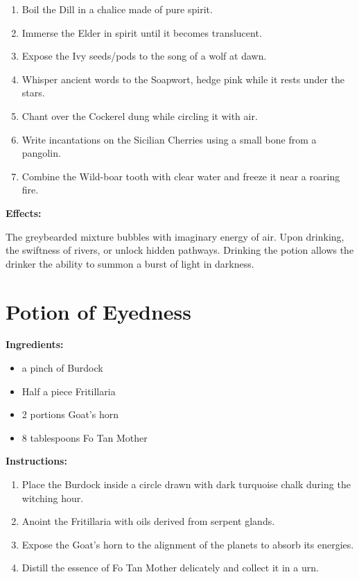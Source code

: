 \documentclass{article}
\begin{document}
\begin{enumerate}
  \item Boil the Dill in a chalice made of pure spirit.
  \item Immerse the Elder in spirit until it becomes translucent.
  \item Expose the Ivy seeds/pods to the song of a wolf at dawn.
  \item Whisper ancient words to the Soapwort, hedge pink while it rests under the stars.
  \item Chant over the Cockerel dung while circling it with air.
  \item Write incantations on the Sicilian Cherries using a small bone from a pangolin.
  \item Combine the Wild-boar tooth with clear water and freeze it near a roaring fire.
\end{enumerate}

\textbf{Effects:}

The greybearded mixture bubbles with imaginary energy of air. Upon drinking, the swiftness of rivers, or unlock hidden pathways. Drinking the potion allows the drinker the ability to summon a burst of light in darkness.

\newpage
\section*{Potion of Eyedness}

\textbf{Ingredients:}

\begin{itemize}
  \item a pinch of Burdock
  \item Half a piece Fritillaria
  \item 2 portions Goat's horn
  \item 8 tablespoons Fo Tan Mother
\end{itemize}

\textbf{Instructions:}

\begin{enumerate}
  \item Place the Burdock inside a circle drawn with dark turquoise chalk during the witching hour.
  \item Anoint the Fritillaria with oils derived from serpent glands.
  \item Expose the Goat's horn to the alignment of the planets to absorb its energies.
  \item Distill the essence of Fo Tan Mother delicately and collect it in a urn.
\end{enumerate}
\end{document}
